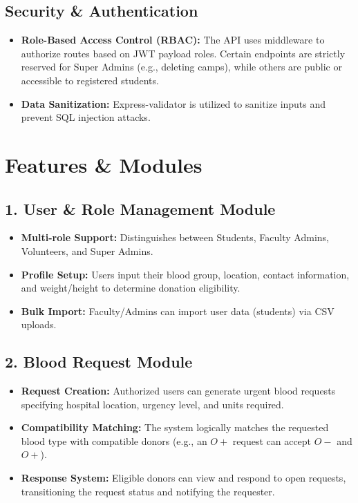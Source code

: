\documentclass[12pt, a4paper]{article}
\begin{document}
\subsection{Security \& Authentication}
\begin{itemize}
    \item \textbf{Role-Based Access Control (RBAC):} The API uses middleware to authorize routes based on JWT payload roles. Certain endpoints are strictly reserved for Super Admins (e.g., deleting camps), while others are public or accessible to registered students.
    \item \textbf{Data Sanitization:} Express-validator is utilized to sanitize inputs and prevent SQL injection attacks.
\end{itemize}

\section{Features \& Modules}
\subsection{1. User \& Role Management Module}
\begin{itemize}
    \item \textbf{Multi-role Support:} Distinguishes between Students, Faculty Admins, Volunteers, and Super Admins.
    \item \textbf{Profile Setup:} Users input their blood group, location, contact information, and weight/height to determine donation eligibility.
    \item \textbf{Bulk Import:} Faculty/Admins can import user data (students) via CSV uploads.
\end{itemize}

\subsection{2. Blood Request Module}
\begin{itemize}
    \item \textbf{Request Creation:} Authorized users can generate urgent blood requests specifying hospital location, urgency level, and units required.
    \item \textbf{Compatibility Matching:} The system logically matches the requested blood type with compatible donors (e.g., an $O+$ request can accept $O-$ and $O+$).
    \item \textbf{Response System:} Eligible donors can view and respond to open requests, transitioning the request status and notifying the requester.
\end{itemize}
\end{document}
